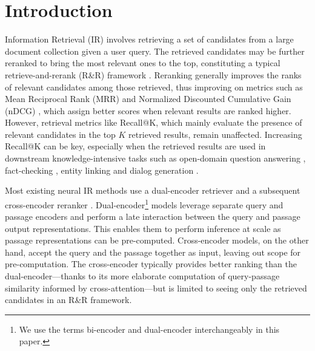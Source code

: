 \section{Introduction}

Information Retrieval (IR) involves retrieving a set of candidates from a large document collection
given a user query. The retrieved candidates may be further reranked to bring the most relevant ones to the top, constituting a typical retrieve-and-rerank (R\&R) framework \cite{wang2018evidence, hu2019retrieve}.
Reranking generally improves the ranks of relevant candidates among those retrieved, thus improving on metrics such as Mean Reciprocal Rank (MRR) \cite{Craswell2009} and Normalized Discounted Cumulative Gain (nDCG) \cite{jarvelin2002cumulated}, which assign better scores when relevant results are ranked higher. 
However, retrieval metrics like Recall@K, which mainly evaluate the presence of relevant candidates in the top $K$ retrieved results, remain unaffected.
Increasing Recall@K can be key, especially when the retrieved results are used in downstream knowledge-intensive tasks \cite{petroni2021kilt} such as open-domain question answering \cite{chen2017reading, chen2020open, gangi2021synthetic}, fact-checking \cite{thorne2018fever}, entity linking \cite{hoffart2011robust,sil2013re,sil2018neural} and dialog generation \cite{dinan2018wizard, komeili2022internet}.

Most existing neural IR methods use a dual-encoder retriever \cite{karpukhin2020dense, khattab2020colbert} and a subsequent cross-encoder reranker \cite{nogueira2019passage}. 
Dual-encoder\footnote{We use the terms bi-encoder and dual-encoder interchangeably in this paper.} models leverage separate query and passage encoders and perform a late interaction between the query and passage output representations. This enables them to perform inference at scale as passage representations can be pre-computed. Cross-encoder models, on the other hand, accept the query and the passage together as input, leaving out scope for pre-computation. The cross-encoder typically provides better ranking than the dual-encoder---thanks to its more elaborate computation of query-passage similarity informed by cross-attention---but is limited to seeing only the retrieved candidates in an R\&R
framework.


